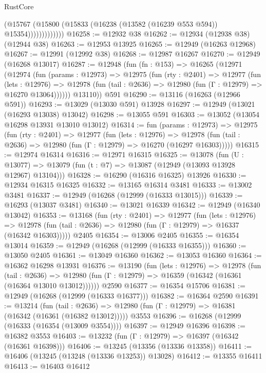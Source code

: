 \begin{lexlean}{RustCore}
\begin{coremodule}
                      (@15767
                        (@15800 (@15833 (@16238 (@13582 (@16239 @553 @594)) @15354)))))))))))))
@16258 := @12932 @38
@16262 := @12934 (@12938 @38) (@12944 @38)
@16263 := @12953 @13925
@16265 := @12949 (@16263 @12968)
@16267 := @12991 (@12992 @38)
@16268 := @12987 @16267
@16270 := @12949 (@16268 @13017)
@16287 := @12948
    (fun (fn : @153) =>
    @16265
      (@12971
        (@12974
          (fun (params : @12973) =>
          @12975
            (fun (rty : @2401) =>
            @12977
              (fun (lets : @12976) =>
              @12978 (fun (tail : @2636) => @12980 (fun (Γ : @12979) => @16270 @13064))))))
        @13110))
    @591
@16290 := @13116 (@16263 (@12966 @591))
@16293 := @13029 (@13030 @591) @13928
@16297 := @12949 (@13021 (@16293 @13038) @13042)
@16298 := @13055 @591
@16303 := @13052 (@13054 @16298 @13931 @13010 @13012)
@16314 := fun (params : @12973) =>
  @12975
    (fun (rty : @2401) =>
    @12977
      (fun (lets : @12976) =>
      @12978 (fun (tail : @2636) => @12980 (fun (Γ : @12979) => @16270 (@16297 @16303)))))
@16315 := @12974 @16314
@16316 := @12971 @16315
@16325 := @13078
    (fun (U : @13077) => @13079 (fun (t : @7) => @13087 (@12949 (@13093 @13928 @12967) @13104)))
@16328 := @16290 (@16316 @16325) @13926
@16330 := @12934 @16315 @16325
@16332 := @13165 @16314 @3481
@16333 := @13002 @3481
@16337 := @12949 (@16268 (@12999 (@16333 @13015)))
@16339 := @16293 (@13037 @3481)
@16340 := @13021 @16339
@16342 := @12949 (@16340 @13042)
@16353 := @13168
    (fun (rty : @2401) =>
    @12977
      (fun (lets : @12976) =>
      @12978 (fun (tail : @2636) => @12980 (fun (Γ : @12979) => @16337 (@16342 @16303)))))
    @2405
@16354 := @13006 @2405
@16355 := @16354 @13014
@16359 := @12949 (@16268 (@12999 (@16333 @16355)))
@16360 := @13050 @2405
@16361 := @13049 @16360
@16362 := @13053 @16360
@16364 := @16362 @16298 @13931
@16376 := @13190
    (fun (lets : @12976) =>
    @12978
      (fun (tail : @2636) =>
      @12980 (fun (Γ : @12979) => @16359 (@16342 (@16361 (@16364 @13010 @13012))))))
    @2590
@16377 := @16354 @15706
@16381 := @12949 (@16268 (@12999 (@16333 @16377)))
@16382 := @16364 @2590
@16391 := @13214
    (fun (tail : @2636) => @12980 (fun (Γ : @12979) => @16381 (@16342 (@16361 (@16382 @13012)))))
    @3553
@16396 := @16268 (@12999 (@16333 (@16354 (@13009 @3554))))
@16397 := @12949 @16396
@16398 := @16382 @3553
@16403 := @13232 (fun (Γ : @12979) => @16397 (@16342 (@16361 @16398)))
@16406 := @13245 (@13356 (@13336 @13358))
@16411 := @16406 (@13245 (@13248 (@13336 @13253)) @13028)
@16412 := @13355 @16411
@16413 := @16403 @16412

\end{coremodule}
\end{lexlean}

